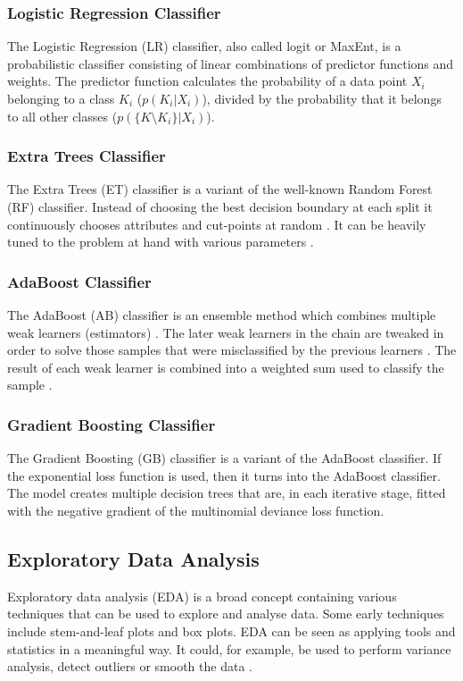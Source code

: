 \subsubsection{Logistic Regression Classifier}
The Logistic Regression (LR) classifier, also called logit or MaxEnt, is a probabilistic classifier consisting of linear combinations of predictor functions and weights.
The predictor function calculates the probability of a data point $X_i$ belonging to a class $K_i$ ($p(K_i|X_i)$), divided by the probability that it belongs to all other classes ($p(\{K \setminus K_i\} | X_i)$).

\subsubsection{Extra Trees Classifier}
The Extra Trees (ET) classifier is a variant of the well-known Random Forest (RF) classifier.
Instead of choosing the best decision boundary at each split it continuously chooses attributes and cut-points at random \cite{Geurts2006}.
It can be heavily tuned to the problem at hand with various parameters \cite{Geurts2006}.

\subsubsection{AdaBoost Classifier}
The AdaBoost (AB) classifier is an ensemble method which combines multiple weak learners (estimators) \cite{Freund1995}.
The later weak learners in the chain are tweaked in order to solve those samples that were misclassified by the previous learners \cite{Freund1995}.
The result of each weak learner is combined into a weighted sum used to classify the sample \cite{Freund1995}.

\subsubsection{Gradient Boosting Classifier}
The Gradient Boosting (GB) classifier is a variant of the AdaBoost classifier.
If the exponential loss function is used, then it turns into the AdaBoost classifier.
The model creates multiple decision trees that are, in each iterative stage, fitted with the negative gradient of the multinomial deviance loss function.

\subsection{Exploratory Data Analysis}
Exploratory data analysis (EDA) is a broad concept containing various techniques \cite{Hoaglin2003, Tukey1977, Velleman1981} that can be used to explore and analyse data.
Some early techniques include stem-and-leaf plots and box plots.
EDA can be seen as applying tools and statistics in a meaningful way.
It could, for example, be used to perform variance analysis, detect outliers or smooth the data \cite{Hoaglin2003, Tukey1977, Velleman1981}.

